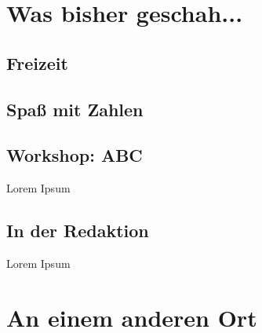 
%



\usepackage{enumitem}









%



\makemultititle
%

\section{Was bisher geschah...}

\subsection{Freizeit}

\subsection{Spaß mit Zahlen}

\subsection{Workshop: ABC}
Lorem Ipsum

\subsection{In der Redaktion}
Lorem Ipsum

\section{An einem anderen Ort}


